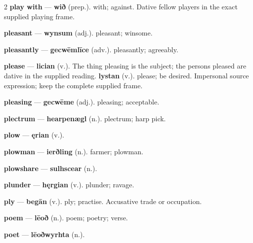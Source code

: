 \begin{multicols}{2}
\textbf{play with} — \textbf{wið} (prep.). with; against. Dative fellow players in the exact supplied playing frame.\par
\textbf{pleasant} — \textbf{wynsum} (adj.). pleasant; winsome.\par
\textbf{pleasantly} — \textbf{gecwēmlīce} (adv.). pleasantly; agreeably.\par
\textbf{please} — \textbf{lician} (v.). The thing pleasing is the subject; the persons pleased are dative in the supplied reading. \textbf{lystan} (v.). please; be desired. Impersonal source expression; keep the complete supplied frame.\par
\textbf{pleasing} — \textbf{gecwēme} (adj.). pleasing; acceptable.\par
\textbf{plectrum} — \textbf{hearpenægl} (n.). plectrum; harp pick.\par
\textbf{plow} — \textbf{ęrian} (v.).\par
\textbf{plowman} — \textbf{ierðling} (n.). farmer; plowman.\par
\textbf{plowshare} — \textbf{sulhscear} (n.).\par
\textbf{plunder} — \textbf{hęrgian} (v.). plunder; ravage.\par
\textbf{ply} — \textbf{begān} (v.). ply; practise. Accusative trade or occupation.\par
\textbf{poem} — \textbf{lēoð} (n.). poem; poetry; verse.\par
\textbf{poet} — \textbf{lēoðwyrhta} (n.).\par

\end{multicols}

